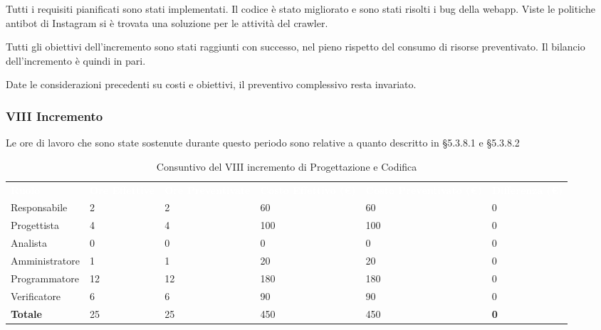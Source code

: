 Tutti i requisiti pianificati sono stati implementati. Il codice è stato migliorato e sono stati risolti i bug della webapp. Viste le politiche antibot di Instagram si è trovata una soluzione per le attività del crawler.

Tutti gli obiettivi dell’incremento sono stati raggiunti con successo, nel pieno rispetto del consumo di risorse preventivato. Il bilancio dell’incremento è quindi in pari.

Date le considerazioni precedenti su costi e obiettivi, il preventivo complessivo resta invariato.


\pagebreak


\subsubsection{VIII Incremento}
Le ore di lavoro che sono state sostenute durante questo periodo sono relative a quanto descritto in §5.3.8.1 e §5.3.8.2

\begin{table}[H]
\begin{center}
\renewcommand{\arraystretch}{1.5}
\begin{tabular}{ m{}<{\centering}  m{}<{\centering} m{}<{\centering} m{}<{\centering} m{}<{\centering} m{}<{\centering}}	\rowcolor{darkblue}
	\textcolor{white}{\textbf{Ruolo}} & \textcolor{white}{\textbf{Ore Effettive}} & \textcolor{white}{\textbf{Ore Preventivate}}&\textcolor{white}{\textbf{Costo Effettivo (\euro)}}&\textcolor{white}{\textbf{Costo Preventivato (\euro)}}&\textcolor{white}{\textbf{Differenza (\euro)}}\\ 

	Responsabile  & 2 & 2 & 60 & 60 & 0\\	
	
	Progettista & 4 & 4 & 100 & 100 & 0\\
	
	Analista & 0 & 0 & 0 & 0 & 0\\
	
	Amministratore & 1 & 1 & 20 & 20 & 0\\
	
	Programmatore & 12 & 12 & 180 & 180 & 0\\
	
	Verificatore & 6 & 6 & 90 & 90 & 0\\
	
	\textbf{Totale} & 25 & 25 & 450 & 450 & \textbf{0} \\
	
\end{tabular}
\caption{Consuntivo del VIII incremento di Progettazione e Codifica}
\end{center}
\end{table}

